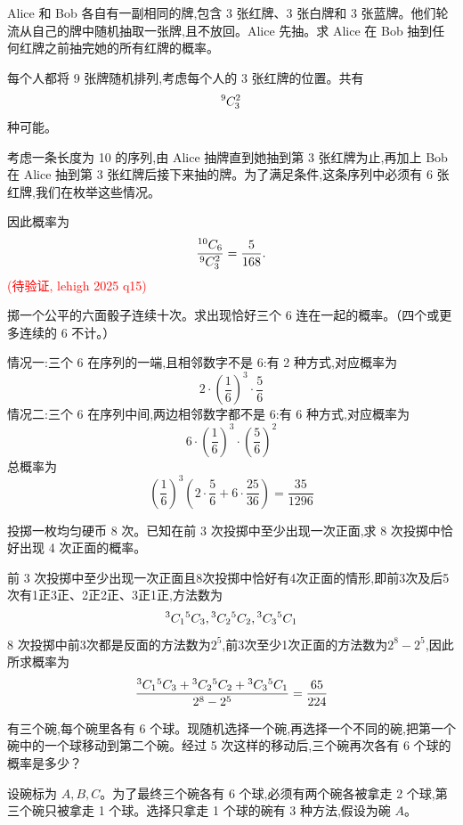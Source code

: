 \begin{questions}
\question Alice 和 Bob 各自有一副相同的牌,包含 3 张红牌、3 张白牌和 3 张蓝牌。他们轮流从自己的牌中随机抽取一张牌,且不放回。Alice 先抽。求 Alice 在 Bob 抽到任何红牌之前抽完她的所有红牌的概率。

\begin{solution}
每个人都将 9 张牌随机排列,考虑每个人的 3 张红牌的位置。共有
\[
{}^{9}C_{3}^2
\]
种可能。

考虑一条长度为 10 的序列,由 Alice 抽牌直到她抽到第 3 张红牌为止,再加上 Bob 在 Alice 抽到第 3 张红牌后接下来抽的牌。为了满足条件,这条序列中必须有 6 张红牌,我们在枚举这些情况。

因此概率为
\[
\frac{{}^{10}C_{6}}{{}^{9}C_{3}^2} = \frac{5}{168}.
\]
        \textcolor{red}{(待验证, lehigh 2025 q15)}
\end{solution}

    \question 掷一个公平的六面骰子连续十次。求出现恰好三个 6 连在一起的概率。（四个或更多连续的 6 不计。）
    \begin{solution}
        情况一:三个 6 在序列的一端,且相邻数字不是 6:有 2 种方式,对应概率为
        \[
        2 \cdot \left(\frac{1}{6}\right)^3 \cdot \frac{5}{6}
        \]
        情况二:三个 6 在序列中间,两边相邻数字都不是 6:有 6 种方式,对应概率为
        \[
        6 \cdot \left(\frac{1}{6}\right)^3 \cdot \left(\frac{5}{6}\right)^2
        \]
        总概率为
        \[
        \left(\frac{1}{6}\right)^3 \left(2 \cdot \frac{5}{6} + 6 \cdot \frac{25}{36}\right) = \frac{35}{1296}
        \]
    \end{solution}

    \question 投掷一枚均匀硬币 8 次。已知在前 3 次投掷中至少出现一次正面,求 8 次投掷中恰好出现 4 次正面的概率。
    \begin{solution} 
        前 3 次投掷中至少出现一次正面且8次投掷中恰好有4次正面的情形,即前3次及后5次有1正3正、2正2正、3正1正,方法数为
        \[
        {}^{3}C_{1}{}^{5}C_{3},{}^{3}C_{2}{}^{5}C_{2},{}^{3}C_{3}{}^{5}C_{1}
        \]
        8 次投掷中前3次都是反面的方法数为$2^5$,前3次至少1次正面的方法数为$2^8 - 2^5$,因此所求概率为
        \[
        \frac{{}^{3}C_{1}{}^{5}C_{3} + {}^{3}C_{2}{}^{5}C_{2} + {}^{3}C_{3}{}^{5}C_{1}}{2^8 - 2^5}
        = \frac{65}{224}
        \]
    \end{solution}

    \question 有三个碗,每个碗里各有 6 个球。现随机选择一个碗,再选择一个不同的碗,把第一个碗中的一个球移动到第二个碗。经过 5 次这样的移动后,三个碗再次各有 6 个球的概率是多少？
    \begin{solution}
        设碗标为 $A, B, C$。为了最终三个碗各有 6 个球,必须有两个碗各被拿走 2 个球,第三个碗只被拿走 1 个球。选择只拿走 1 个球的碗有 3 种方法,假设为碗 $A$。


\end{solution}
\end{questions}
